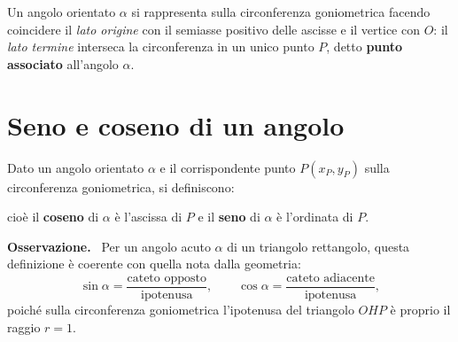 \documentclass[11pt,a4paper]{article}
\newenvironment{osservazione}{%
  \par\vspace{4pt}\noindent
  \textbf{\color{orange!70!black}Osservazione.}\ 
}{%
  \par\vspace{4pt}
}
\newcommand{\formulabox}[1]{%
  \begin{center}
  \fbox{\parbox{0.9\linewidth}{\centering\vspace{2pt}#1\vspace{2pt}}}
  \end{center}
}
\begin{document}
Un angolo orientato $\alpha$ si rappresenta sulla circonferenza goniometrica facendo coincidere il \emph{lato origine} con il semiasse positivo delle ascisse e il vertice con $O$: il \emph{lato termine} interseca la circonferenza in un unico punto $P$, detto \textbf{punto associato} all'angolo $\alpha$.

\begin{center}
\end{center}

\section{Seno e coseno di un angolo}

Dato un angolo orientato $\alpha$ e il corrispondente punto $P(x_P,y_P)$ sulla circonferenza goniometrica, si definiscono:

\formulabox{$\cos\alpha = x_P \qquad\qquad \sin\alpha = y_P$}

cio\`e il \textbf{coseno} di $\alpha$ \`e l'ascissa di $P$ e il \textbf{seno} di $\alpha$ \`e l'ordinata di $P$.

\begin{osservazione}
Per un angolo acuto $\alpha$ di un triangolo rettangolo, questa definizione \`e coerente con quella nota dalla geometria:
\[
\sin\alpha = \frac{\text{cateto opposto}}{\text{ipotenusa}}, \qquad \cos\alpha = \frac{\text{cateto adiacente}}{\text{ipotenusa}},
\]
poich\'e sulla circonferenza goniometrica l'ipotenusa del triangolo $OHP$ \`e proprio il raggio $r=1$.
\end{osservazione}
\end{document}
